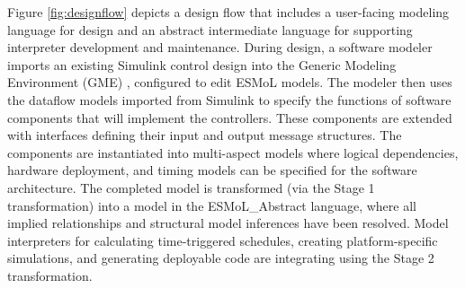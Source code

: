 Figure \ref{fig:designflow} depicts a design flow that includes a user-facing modeling language 
for design and an abstract intermediate language for supporting interpreter development and
maintenance.  During design, a software modeler imports an existing Simulink control design into 
the Generic Modeling Environment (GME) \cite{mic:gme}, configured to edit ESMoL models.  The modeler
then uses the dataflow models imported from Simulink to specify the functions of software components
that will implement the controllers.  These components are extended with interfaces defining their 
input and output message structures.  The components are instantiated into multi-aspect models where 
logical dependencies, hardware deployment, and timing models can be specified for the software architecture.
The completed model is transformed (via the Stage 1 transformation) into a model in the 
ESMoL\_Abstract language, where all implied relationships and structural model inferences have been resolved.  
Model interpreters for calculating time-triggered schedules, creating platform-specific simulations, and
generating deployable code are integrating using the Stage 2 transformation.




